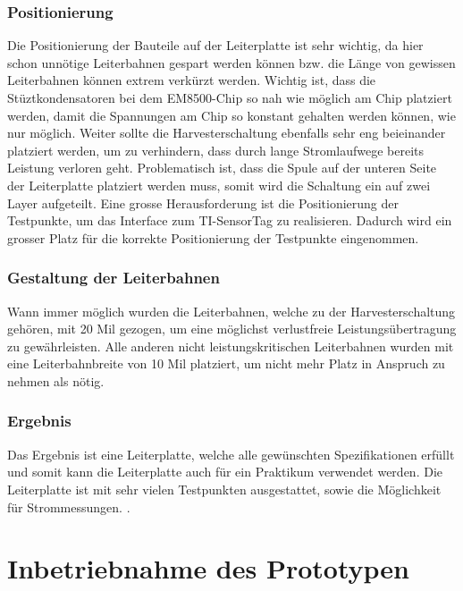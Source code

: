 \subsubsection{Positionierung}
Die Positionierung der Bauteile auf der Leiterplatte ist sehr wichtig, da hier schon unnötige Leiterbahnen gespart werden können bzw. die Länge von gewissen Leiterbahnen können extrem verkürzt werden.
Wichtig ist, dass die Stüztkondensatoren bei dem EM8500-Chip so nah wie möglich am Chip platziert werden, damit die Spannungen am Chip so konstant gehalten werden können, wie nur möglich.
Weiter sollte die Harvesterschaltung ebenfalls sehr eng beieinander platziert werden, um zu verhindern, dass durch lange Stromlaufwege bereits Leistung verloren geht. Problematisch ist, dass die Spule auf der unteren Seite der Leiterplatte platziert werden muss, somit wird die Schaltung ein auf zwei Layer aufgeteilt.
Eine grosse Herausforderung ist die Positionierung der Testpunkte, um das Interface zum TI-SensorTag zu realisieren. Dadurch wird ein grosser Platz für die korrekte Positionierung der Testpunkte eingenommen.

\subsubsection{Gestaltung der Leiterbahnen}

Wann immer möglich wurden die Leiterbahnen, welche zu der Harvesterschaltung gehören, mit 20 Mil gezogen, um eine möglichst verlustfreie Leistungsübertragung zu gewährleisten. Alle anderen nicht leistungskritischen Leiterbahnen wurden mit eine Leiterbahnbreite von 10 Mil platziert, um nicht mehr Platz in Anspruch zu nehmen als nötig.

\subsubsection{Ergebnis}

Das Ergebnis ist eine Leiterplatte, welche alle gewünschten Spezifikationen erfüllt und somit kann die Leiterplatte auch für ein Praktikum verwendet werden. Die Leiterplatte ist mit sehr vielen Testpunkten ausgestattet, sowie die Möglichkeit für Strommessungen.
.

\section{Inbetriebnahme des Prototypen}

